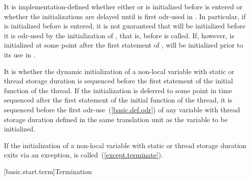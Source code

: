 It is implementation-defined whether either  or  is
initialized before  is entered or whether the
initializations are delayed until  is first odr-used in
. In particular, if  is initialized before
 is entered, it is not guaranteed that  will be
initialized before it is odr-used by the initialization of , that
is, before  is called. If, however,  is initialized
at some point after the first statement of ,  will
be initialized prior to its use in . \exitexample

\pnum
It is 
whether the dynamic initialization of a non-local variable with static
or thread storage duration is sequenced before
the first statement of the initial function of the thread.
If the initialization is deferred to some point in time sequenced after
the first statement of the initial function of the thread,
it is sequenced before the first odr-use~(\ref{basic.def.odr})
of any variable with thread storage duration defined
in the same translation unit as the variable to be initialized.

\pnum
If the initialization of a non-local variable with static or thread storage duration
exits via
an exception,  is called~(\ref{except.terminate}).%

[basic.start.term]{Termination}

